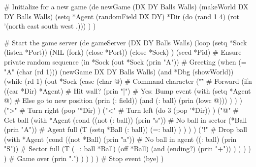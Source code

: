 \begin{wideverbatim}

# Initialize for a new game
(de newGame (DX DY Balls Walls)
   (makeWorld DX DY Balls Walls)
   (setq
      *Agent (randomField DX DY)
      *Dir (do (rand 1 4) (rot '(north east south west .))) ) )


# Start the game server
(de gameServer (DX DY Balls Walls)
   (loop
      (setq *Sock (listen *Port))
      (NIL (fork) (close *Port))
      (close *Sock) )
   (seed *Pid)  # Ensure private random sequence
   (in *Sock
      (out *Sock (prin "A"))  # Greeting
      (when (= "A" (char (rd 1)))
         (newGame DX DY Balls Walls)
         (and *Dbg (showWorld))
         (while (rd 1)
            (out *Sock
               (case (char @)  # Command character
                  ("\^"  # Forward
                     (ifn ((car *Dir) *Agent)  # Hit wall?
                        (prin "|")             # Yes: Bump event
                        (with (setq *Agent @)  # Else go to new position
                           (prin (: field))
                           (and (: ball) (prin (lowc @))) ) ) )
                  (">"  # Turn right
                     (pop '*Dir) )
                  ("<"  # Turn left
                     (do 3 (pop '*Dir)) )
                  ("@"  # Get ball
                     (with *Agent
                        (cond
                           ((not (: ball)) (prin "s"))  # No ball in sector
                           (*Ball (prin "A"))           # Agent full
                           (T
                              (setq *Ball (: ball))
                              (=: ball) ) ) ) )
                  ("!"  # Drop ball
                     (with *Agent
                        (cond
                           ((not *Ball) (prin "a"))  # No ball in agent
                           ((: ball) (prin "S"))     # Sector full
                           (T (=: ball *Ball)
                              (off *Ball)
                              (and (ending?) (prin "+")) ) ) ) ) )  # Game over
               (prin ".") ) ) ) )  # Stop event
   (bye) )


\end{wideverbatim}

